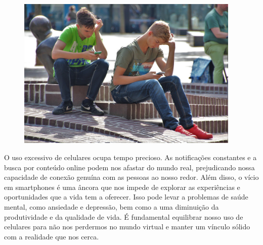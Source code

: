 \begin{myquote}

\begin{figure}[H]
\centering
\includegraphics[width=0.95\textwidth]{./imgSAEB_7_POR/media/image64.png}
\end{figure} 
O uso excessivo de celulares ocupa tempo precioso. As notificações constantes
e a busca por conteúdo online podem nos afastar do mundo real,
prejudicando nossa capacidade de conexão genuína com as pessoas ao nosso
redor. Além disso, o vício em smartphones é uma âncora que nos impede de
explorar as experiências e oportunidades que a vida tem a oferecer. Isso pode
levar a problemas de saúde mental, como ansiedade e depressão, bem como a uma
diminuição da produtividade e da qualidade de vida. É fundamental equilibrar
nosso uso de celulares para não nos perdermos no mundo virtual e manter um
vínculo sólido com a realidade que nos cerca.


\end{myquote}



